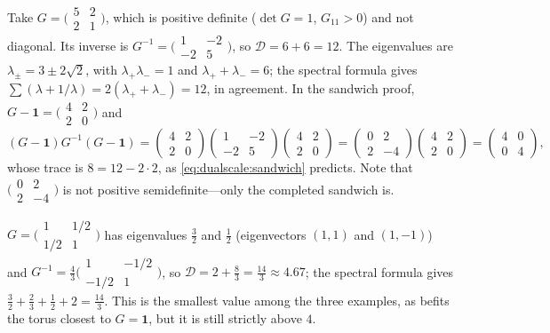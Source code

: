 \begin{example}\label{ex:dualscale:shear}
Take $G=\big(\begin{smallmatrix}5&2\\2&1\end{smallmatrix}\big)$, which is positive definite
($\det G=1$, $G_{11}>0$) and not diagonal. Its inverse is
$G^{-1}=\big(\begin{smallmatrix}1&-2\\-2&5\end{smallmatrix}\big)$, so
$\mathcal D=6+6=12$. The eigenvalues are $\lambda_\pm=3\pm2\sqrt2$, with
$\lambda_+\lambda_-=1$ and $\lambda_++\lambda_-=6$; the spectral formula gives
$\sum(\lambda+1/\lambda)=2(\lambda_++\lambda_-)=12$, in agreement. In the sandwich proof,
$G-\mathbf1=\big(\begin{smallmatrix}4&2\\2&0\end{smallmatrix}\big)$ and
\[
 (G-\mathbf1)G^{-1}(G-\mathbf1)
 =\begin{pmatrix}4&2\\2&0\end{pmatrix}\begin{pmatrix}1&-2\\-2&5\end{pmatrix}
  \begin{pmatrix}4&2\\2&0\end{pmatrix}
 =\begin{pmatrix}0&2\\2&-4\end{pmatrix}\begin{pmatrix}4&2\\2&0\end{pmatrix}
 =\begin{pmatrix}4&0\\0&4\end{pmatrix},
\]
whose trace is $8=12-2\cdot2$, as \eqref{eq:dualscale:sandwich} predicts. Note that
$\big(\begin{smallmatrix}0&2\\2&-4\end{smallmatrix}\big)$ is not positive semidefinite---only the
completed sandwich is.
\end{example}

\begin{example}\label{ex:dualscale:hex}
$G=\big(\begin{smallmatrix}1&1/2\\1/2&1\end{smallmatrix}\big)$ has eigenvalues $\tfrac32$ and
$\tfrac12$ (eigenvectors $(1,1)$ and $(1,-1)$) and
$G^{-1}=\tfrac43\big(\begin{smallmatrix}1&-1/2\\-1/2&1\end{smallmatrix}\big)$, so
$\mathcal D=2+\tfrac83=\tfrac{14}3\approx4.67$; the spectral formula gives
$\tfrac32+\tfrac23+\tfrac12+2=\tfrac{14}3$. This is the smallest value among the three
examples, as befits the torus closest to $G=\mathbf1$, but it is still strictly above $4$.
\end{example}

